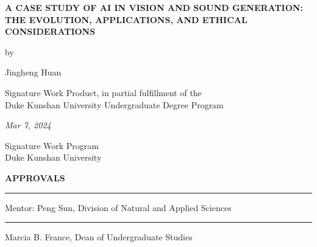 \documentclass[11pt,a4paper,oneside]{report}
\begin{document}
\onehalfspacing

\newcommand{\authorname}{Jingheng Huan}

\newcommand{\thetitle}{A CASE STUDY OF AI IN VISION AND SOUND GENERATION: THE EVOLUTION, APPLICATIONS, AND ETHICAL CONSIDERATIONS}

\newcommand{\submissiondate}{Mar 7, 2024}

\newcommand{\mentor}{Peng Sun}

\newcommand{\academicunit}{Division of Natural and Applied Sciences}






\begin{titlepage}

\vspace*{\bigskipamount}

\begin{center}
{\sffamily\LARGE\bfseries\MakeUppercase\thetitle\par}

\bigskip

by

\bigskip

{\Large \authorname}

\bigskip

Signature Work Product, in partial fulfillment of the \\
Duke Kunshan University Undergraduate Degree Program

\bigskip

\emph{\submissiondate}

\bigskip

Signature Work Program \\
Duke Kunshan University

\end{center}

\vfill

\textbf{\textsf{APPROVALS}}

\bigskip\bigskip\bigskip
\hrule

Mentor: \mentor, \academicunit

\bigskip\bigskip\bigskip
\hrule

Marcia B. France, Dean of Undergraduate Studies

\end{titlepage}
\end{document}
